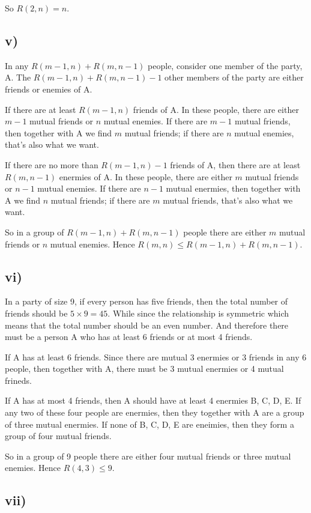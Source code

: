 \documentclass[a4paper,12pt,titlepage]{article}
\begin{document}
So $R(2,n)=n$.

\subsection*{v)}
In any $R(m-1,n)+R(m,n-1)$ people, consider one member of the party, A. The $R(m-1,n)+R(m,n-1)-1$ other members of the party are either friends or enemies of A. 

If there are at least $R(m-1,n)$ friends of A. In these people, there are either $m-1$ mutual friends or $n$ mutual enemies. If there are $m-1$ mutual friends, then together with A we find $m$ mutual friends; if there are $n$ mutual enemies, that's also what we want.

If there are no more than $R(m-1,n)-1$ friends of A, then there are at least $R(m,n-1)$ enermies of A. In these people, there are either $m$ mutual friends or $n-1$ mutual enemies. If there are $n-1$ mutual enermies, then together with A we find $n$ mutual friends; if there are $m$ mutual friends, that's also what we want.

So in a group of $R(m-1,n)+R(m,n-1)$ people there are either $m$ mutual friends or $n$ mutual enemies. Hence $R(m,n)\leqslant R(m-1,n)+R(m,n-1)$.

\subsection*{vi)}

In a party of size 9, if every person has five friends, then the total number of friends should be $5\times 9=45$. While since the relationship is symmetric which means that the total number should be an even number. And therefore there must be a person A who has at least 6 friends or at most 4 friends.   

If A has at least 6 friends. Since there are mutual 3 enermies or 3 friends in any 6 people, then together with A, there must be 3 mutual enermies or 4 mutual frineds. 

If A has at most 4 friends, then A should have at least 4 enermies B, C, D, E. If any two of these four people are enermies, then they together with A are a group of three mutual enermies. If none of B, C, D, E are eneimies, then they form a group of four mutual friends.

So in a group of 9 people there are either four mutual friends or three mutual enemies. Hence $R(4,3)\leqslant9$.

\subsection*{vii)}
\end{document}
